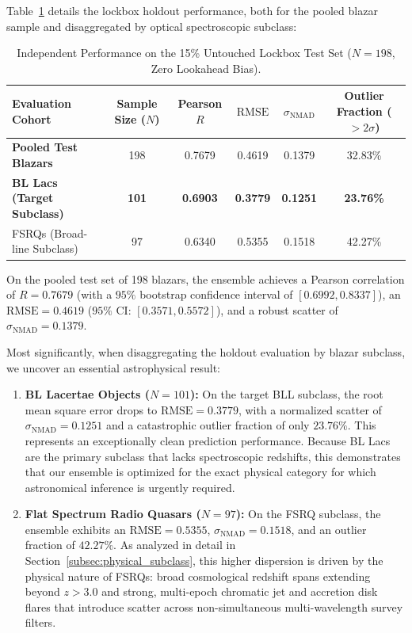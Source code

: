 \documentclass[twocolumn,linenumbers,floatfix]{aastex701}
\begin{document}
Table~\ref{tab:lockbox_evaluation} details the lockbox holdout performance, both for the pooled blazar sample and disaggregated by optical spectroscopic subclass:

\begin{table}[t!]
\centering
\caption{Independent Performance on the 15\% Untouched Lockbox Test Set ($N=198$, Zero Lookahead Bias).}
\label{tab:lockbox_evaluation}
\renewcommand{\arraystretch}{1.15}
\setlength{\tabcolsep}{14pt}
\small
\begin{tabular}{lccccc}
\hline\hline
Evaluation Cohort & Sample Size ($N$) & Pearson $R$ & $\mathrm{RMSE}$ & $\sigma_{\mathrm{NMAD}}$ & Outlier Fraction ($>2\sigma$) \\
\hline
\textbf{Pooled Test Blazars} & 198 & 0.7679 & 0.4619 & 0.1379 & 32.83\% \\
\textbf{BL Lacs (Target Subclass)} & \textbf{101} & \textbf{0.6903} & \textbf{0.3779} & \textbf{0.1251} & \textbf{23.76\%} \\
FSRQs (Broad-line Subclass) & 97 & 0.6340 & 0.5355 & 0.1518 & 42.27\% \\
\hline
\end{tabular}
\end{table}

On the pooled test set of 198 blazars, the ensemble achieves a Pearson correlation of $R = 0.7679$ (with a $95\%$ bootstrap confidence interval of $[0.6992, 0.8337]$), an $\text{RMSE} = 0.4619$ ($95\%$ CI: $[0.3571, 0.5572]$), and a robust scatter of $\sigma_{\text{NMAD}} = 0.1379$.

Most significantly, when disaggregating the holdout evaluation by blazar subclass, we uncover an essential astrophysical result:
\begin{enumerate}
    \item \textbf{BL Lacertae Objects ($N=101$):} On the target BLL subclass, the root mean square error drops to $\text{RMSE} = 0.3779$, with a normalized scatter of $\sigma_{\text{NMAD}} = 0.1251$ and a catastrophic outlier fraction of only $23.76\%$. This represents an exceptionally clean prediction performance. Because BL Lacs are the primary subclass that lacks spectroscopic redshifts, this demonstrates that our ensemble is optimized for the exact physical category for which astronomical inference is urgently required.
    \item \textbf{Flat Spectrum Radio Quasars ($N=97$):} On the FSRQ subclass, the ensemble exhibits an $\text{RMSE} = 0.5355$, $\sigma_{\text{NMAD}} = 0.1518$, and an outlier fraction of $42.27\%$. As analyzed in detail in Section~\ref{subsec:physical_subclass}, this higher dispersion is driven by the physical nature of FSRQs: broad cosmological redshift spans extending beyond $z > 3.0$ and strong, multi-epoch chromatic jet and accretion disk flares that introduce scatter across non-simultaneous multi-wavelength survey filters.
\end{enumerate}
\end{document}
